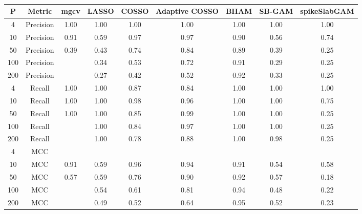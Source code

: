 \begin{table}[ht]
\centering
\begin{tabular}{ccccccccc}
  \hline
P & Metric & mgcv & LASSO & COSSO & Adaptive COSSO & BHAM & SB-GAM & spikeSlabGAM \\ 
  \hline
  4 & Precision & 1.00 & 1.00 & 1.00 & 1.00 & 1.00 & 1.00 & 1.00 \\ 
   10 & Precision & 0.91 & 0.59 & 0.97 & 0.97 & 0.90 & 0.56 & 0.74 \\ 
   50 & Precision & 0.39 & 0.43 & 0.74 & 0.84 & 0.89 & 0.39 & 0.25 \\ 
  100 & Precision &  & 0.34 & 0.53 & 0.72 & 0.91 & 0.29 & 0.25 \\ 
  200 & Precision &  & 0.27 & 0.42 & 0.52 & 0.92 & 0.33 & 0.25 \\ 
    4 & Recall & 1.00 & 1.00 & 0.87 & 0.84 & 1.00 & 1.00 & 1.00 \\ 
   10 & Recall & 1.00 & 1.00 & 0.98 & 0.96 & 1.00 & 1.00 & 0.75 \\ 
   50 & Recall & 1.00 & 1.00 & 0.85 & 0.99 & 1.00 & 1.00 & 0.25 \\ 
  100 & Recall &  & 1.00 & 0.84 & 0.97 & 1.00 & 1.00 & 0.25 \\ 
  200 & Recall &  & 1.00 & 0.78 & 0.88 & 1.00 & 0.98 & 0.25 \\ 
    4 & MCC &  &  &  &  &  &  &  \\ 
   10 & MCC & 0.91 & 0.59 & 0.96 & 0.94 & 0.91 & 0.54 & 0.58 \\ 
   50 & MCC & 0.57 & 0.59 & 0.76 & 0.90 & 0.92 & 0.57 & 0.18 \\ 
  100 & MCC &  & 0.54 & 0.61 & 0.81 & 0.94 & 0.48 & 0.22 \\ 
  200 & MCC &  & 0.49 & 0.52 & 0.64 & 0.95 & 0.52 & 0.23 \\ 
   \hline
\end{tabular}
\caption{} 
\label{}
\end{table}
